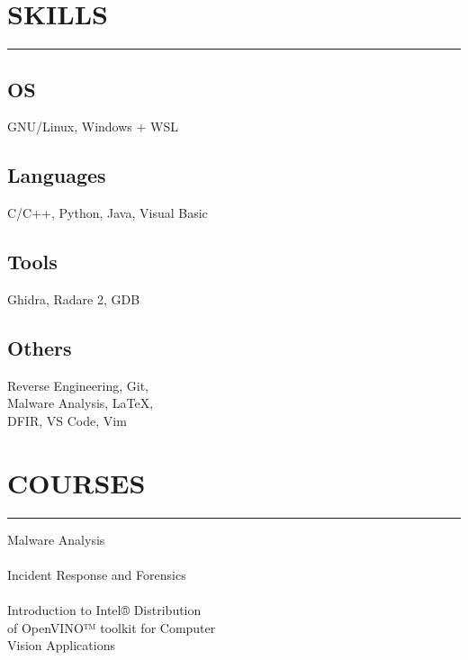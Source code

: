\documentclass[]{resume}
\begin{document}
\begin{minipage}[t]{0.33\textwidth}

    \section{SKILLS}
    \noindent\rule{5 cm}{0.4pt}

    \subsection{OS}
    \noindent GNU/Linux, Windows + WSL

    \vspace{6pt}
    \subsection{Languages}
    \noindent C/C++, Python, Java, Visual Basic

    \vspace{6pt}
    \subsection{Tools}
    \noindent Ghidra, Radare 2, GDB

    \vspace{6pt}
    \subsection{Others}
    \noindent Reverse Engineering, Git,\\
    Malware Analysis, LaTeX,\\
    DFIR, VS Code, Vim


    \section{COURSES}
    \noindent\rule{5cm}{0.4pt}

    \noindent Malware Analysis\\
    \noindent {}\\

    \vspace{6pt}
    \noindent Incident Response and Forensics\\
    \noindent {}\\

    \vspace{6pt}
    \noindent Introduction to Intel® Distribution\\
    of OpenVINO™ toolkit for Computer\\
    Vision Applications\\
    \noindent {}\\

\end{minipage}
\end{document}

